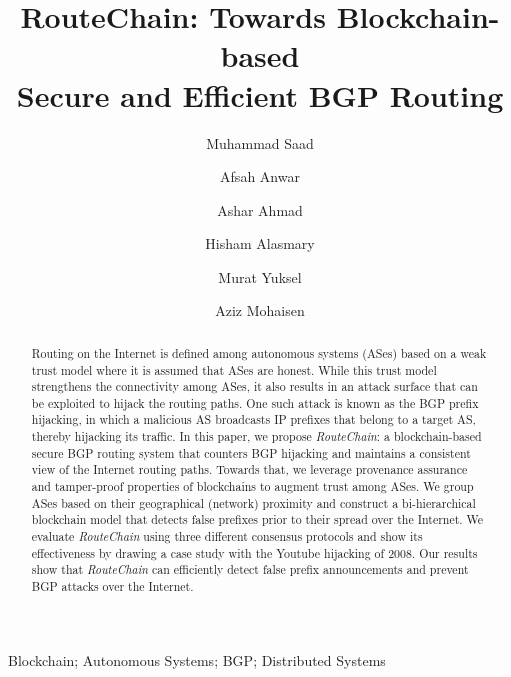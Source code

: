 \documentclass[5p]{elsarticle}
\newcommand{\rc}{{{\em RouteChain}}\xspace}
\begin{document}
\begin{frontmatter}
\title{RouteChain: Towards Blockchain-based \\Secure and Efficient BGP Routing}
\author[]{Muhammad Saad}
\author[]{Afsah Anwar}
\author[]{Ashar Ahmad}
\author[]{Hisham Alasmary}
\author[]{Murat Yuksel}
\author[]{Aziz Mohaisen}



\address{University of Central Florida}


\begin{abstract}
Routing on the Internet is defined among autonomous systems (ASes) based on a weak trust model where it is assumed that ASes are honest. While this trust model strengthens the connectivity among ASes, it also results in an attack surface that can be exploited to hijack the routing paths. One such attack is known as the BGP prefix hijacking, in which a malicious AS broadcasts IP prefixes that belong to a target AS, thereby hijacking its traffic. In this paper, we propose \rc: a blockchain-based secure BGP routing system that counters BGP hijacking and maintains a consistent view of the Internet routing paths. Towards that, we leverage provenance assurance and tamper-proof properties of blockchains to augment trust among ASes. We group ASes based on their geographical (network) proximity and construct a bi-hierarchical blockchain model that detects false prefixes prior to their spread over the Internet. We evaluate \rc using three different consensus protocols and show its effectiveness by drawing a case study with the Youtube hijacking of 2008. Our results show that \rc can efficiently detect false prefix announcements and prevent BGP attacks over the Internet.    
\end{abstract}

\begin{keyword} Blockchain; Autonomous Systems; BGP; Distributed Systems\end{keyword}
\end{frontmatter}
\end{document}
